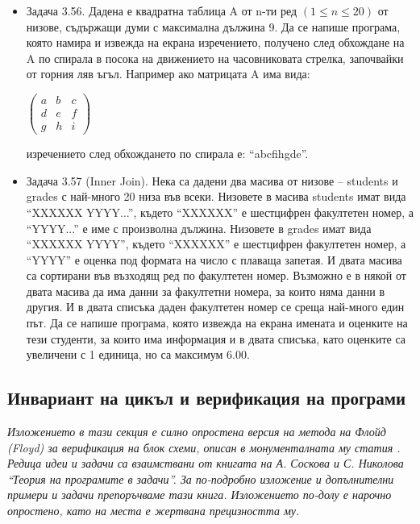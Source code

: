 \documentclass[12pt,a4paper]{article}
\begin{document}
{\begin{itemize}[resume]
  \item Задача 3.56. \cite{sbornik} Дадена е квадратна таблица A от n-ти ред $(1 \le n \le 20)$ от низове, съдържащи думи с максимална дължина 9. Да се напише програма, която намира и извежда на екрана изречението, получено след обхождане на A по спирала в посока на движението на часовниковата стрелка, започвайки от горния ляв ъгъл. Например ако матрицата A има вида:

  $\left( \begin{array}{ccc}
  a & b & c \\
  d & e & f \\
  g & h & i
  \end{array} \right)$

  изречението след обхождането по спирала е: ``abcfihgde''.

  \item Задача 3.57 (Inner Join). \cite{sbornik} Нека са дадени два масива от низове – students и grades с най-много 20 низа във всеки. Низовете в масива students имат вида ``XXXXXX YYYY...'', където ``XXXXXX'' е шестцифрен факултетен номер, а ``YYYY...'' е име с произволна дължина. Низовете в grades имат вида ``XXXXXX YYYY'', където ``XXXXXX'' е шестцифрен факултетен номер, а ``YYYY'' е оценка под формата на число с плаваща запетая. И двата масива са сортирани във възходящ ред по факултетен номер. Възможно е в някой от двата масива да има данни за факултетни номера, за които няма данни в другия. И в двата списъка даден факултетен номер се среща най-много един път. Да се напише програма, която извежда на екрана имената и оценките на тези студенти, за които има информация и в двата списъка, като оценките са увеличени с 1 единица, но са максимум 6.00.

\end{itemize}

\subsection{Инвариант на цикъл и верификация на програми}

\emph{Изложението в тази секция е силно опростена версия на метода на Флойд (Floyd) за верификация на блок схеми, описан в монументалната му статия \cite{floyd}. Редица идеи и задачи са взаимствани от книгата \cite{tpsbornik} на А. Соскова и С. Николова ``Теория на програмите в задачи''. За по-подробно изложение и допълнителни примери и задачи препоръчваме тази книга. Изложението по-долу е нарочно опростено, като на места е жертвана прецизността му.}

}
\end{document}
